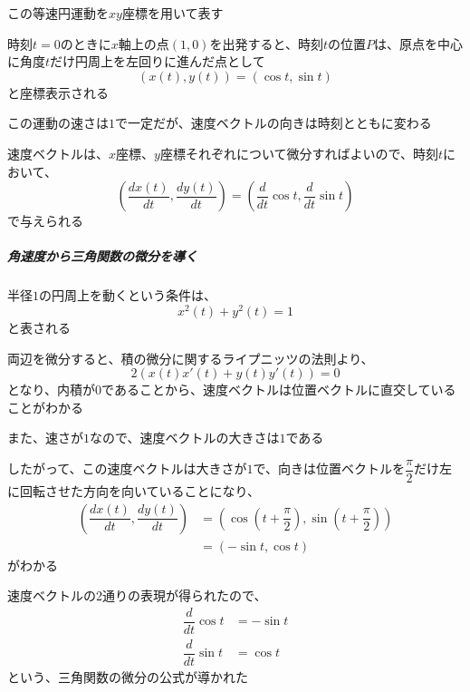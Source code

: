 \documentclass[../book_jiriki_calc]{subfiles}
\begin{document}
この等速円運動を$xy$座標を用いて表す

時刻$t=0$のときに$x$軸上の点$(1,0)$を出発すると、時刻$t$の位置$P$は、原点を中心に角度$t$だけ円周上を左回りに進んだ点として
\begin{equation}
  (x(t), y(t)) = (\cos t, \sin t)
\end{equation}
と座標表示される

\br

この運動の速さは$1$で一定だが、速度ベクトルの向きは時刻とともに変わる

速度ベクトルは、$x$座標、$y$座標それぞれについて微分すればよいので、時刻$t$において、
\begin{equation}
  \left(\dfrac{dx(t)}{dt}, \dfrac{dy(t)}{dt}\right) = \left(\dfrac{d}{dt}\cos t, \dfrac{d}{dt}\sin t\right)
\end{equation}
で与えられる

\br

\subparagraph{角速度から三角関数の微分を導く}\quad

半径$1$の円周上を動くという条件は、
\begin{equation}
  x^2(t) + y^2(t) = 1
\end{equation}
と表される

両辺を微分すると、積の微分に関するライプニッツの法則より、
\begin{equation}
  2 \left(x(t)x'(t) + y(t)y'(t)\right) = 0
\end{equation}
となり、内積が$0$であることから、速度ベクトルは位置ベクトルに直交していることがわかる

\br

また、速さが$1$なので、速度ベクトルの大きさは$1$である

\br

したがって、この速度ベクトルは大きさが$1$で、向きは位置ベクトルを$\dfrac{\pi}{2}$だけ左に回転させた方向を向いていることになり、
\begin{align}
  \left(\dfrac{dx(t)}{dt}, \dfrac{dy(t)}{dt}\right) & = \left(\cos\left(t+\dfrac{\pi}{2}\right), \sin\left(t+\dfrac{\pi}{2}\right)\right) \\
                                                    & = \left(-\sin t, \cos t\right)
\end{align}
がわかる

\br

速度ベクトルの2通りの表現が得られたので、
\begin{align}
  \dfrac{d}{dt}\cos t & = -\sin t \\
  \dfrac{d}{dt}\sin t & = \cos t
\end{align}
という、三角関数の微分の公式が導かれた
\end{document}
